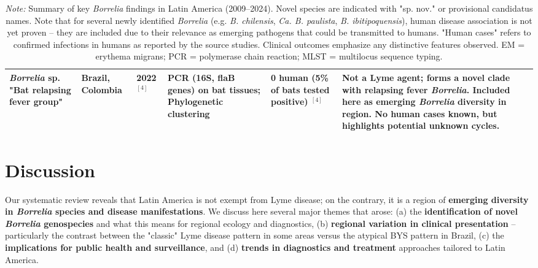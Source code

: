 \documentclass[11pt,letterpaper]{article}
\newcommand{\mycite}[1]{$^{[#1]}$}
\begin{document}
\begin{table}[H]
\begin{tabular}{@{}p{2.8cm}p{1.5cm}p{1.5cm}p{2.8cm}p{1.8cm}p{4.2cm}@{}}
\textit{Borrelia} sp. "Bat relapsing fever group" & Brazil, Colombia & 2022 \mycite{4} & PCR (16S, flaB genes) on bat tissues; Phylogenetic clustering & 0 human (5\% of bats tested positive) \mycite{4} & Not a Lyme agent; forms a novel clade with relapsing fever \textit{Borrelia}. Included here as emerging \textit{Borrelia} diversity in region. No human cases known, but highlights potential unknown cycles. \\ 
\bottomrule
\end{tabular}
\caption*{\small\textit{Note:} Summary of key \textit{Borrelia} findings in Latin America (2009–2024). Novel species are indicated with "sp. nov." or provisional candidatus names. Note that for several newly identified \textit{Borrelia} (e.g. \textit{B. chilensis}, \textit{Ca. B. paulista}, \textit{B. ibitipoquensis}), human disease association is not yet proven – they are included due to their relevance as emerging pathogens that could be transmitted to humans. "Human cases" refers to confirmed infections in humans as reported by the source studies. Clinical outcomes emphasize any distinctive features observed. EM = erythema migrans; PCR = polymerase chain reaction; MLST = multilocus sequence typing.}
\end{table}


\section{Discussion}
Our systematic review reveals that Latin America is not exempt from Lyme disease; on the contrary, it is a region of \textbf{emerging diversity in \textit{Borrelia} species and disease manifestations}. We discuss here several major themes that arose: (a) the \textbf{identification of novel \textit{Borrelia} genospecies} and what this means for regional ecology and diagnostics, (b) \textbf{regional variation in clinical presentation} – particularly the contrast between the "classic" Lyme disease pattern in some areas versus the atypical BYS pattern in Brazil, (c) the \textbf{implications for public health and surveillance}, and (d) \textbf{trends in diagnostics and treatment} approaches tailored to Latin America.
\end{document}
